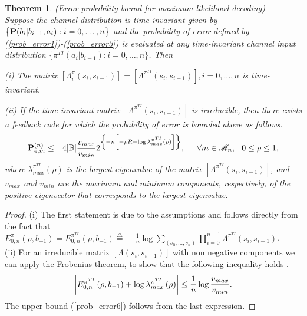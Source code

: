 \documentclass[11pt, a4paper, journal,onecolumn]{IEEEtran}
\newcommand{\mb}{\mathbb}
\newcommand{\sr}{\stackrel}
\newcommand{\tri}{\sr{\triangle}{=}}
\newcommand{\bea}{\begin{eqnarray}}
\newcommand{\eea}{\end{eqnarray}}
\newcommand{\hso}{\hspace{.1in}}
\newcommand{\hst}{\hspace{.2in}}
\newtheorem{theorem}{Theorem}[section]
\begin{document}
\begin{theorem}(Error probability bound for maximum likelihood decoding)\\
\label{the-exp}
Suppose the channel distribution is time-invariant given by  $\big\{{\bf P}(b_i|b_{i-1}, a_i): i=0, \ldots, n\big\}$ and the probability of error defined by (\ref{prob_error1})-(\ref{prob_error3}) is evaluated at any time-invariant channel input distribution $\big\{\pi^{TI}(a_i|b_{i-1}): i=0, \ldots, n\big\}$. Then 
\itemize
\item[(i)] The matrix $\left[ \Lambda_i^\pi(s_i,s_{i-1})\right]=\left[ \Lambda^{\pi^{TI}}(s_i,s_{i-1})\right], i=0, \ldots, n$ is time-invariant.
\item[(ii)]If the time-invariant matrix $\left[ \Lambda^{\pi^{TI}}(s_i,s_{i-1})\right]$ is irreducible, then  there exists a feedback code for which the probability of error is bounded above as follows.
\bea
{\bf P}_{e,m}^{(n)}&\leq& 4|{\mb B}|\frac{v_{max}}{v_{min}} 2^{\left\{-n\left[-\rho R -\log{\lambda_{max}^{\pi^{TI}}\left(\rho\right)}  \right] \right\}}, \hst  \forall m \in  {\cal M}_n, \hso  0\leq \rho \leq 1, \label{prob_error6}
\eea
where $\lambda_{max}^{\pi^{TI}}\left(\rho\right)$ is the largest eigenvalue of the matrix $\left[ \Lambda^{\pi^{TI}}(s_i,s_{i-1})\right]$, and $v_{max}$ and $v_{min}$ are
the maximum and  minimum components, respectively, of the positive eigenvector that corresponds to the largest eigenvalue. 
\end{theorem}
\begin{proof} (i) The first statement is due to the assumptions and follows directly from  the fact that $
E^{\pi}_{0,n}\left(\rho,b_{-1}\right)=E^{\pi^{TI}}_{0,n}\left(\rho, b_{-1}\right)\tri -\frac{1}{n}\log{\sum_{(s_0, \ldots, s_n)}\prod_{i=0}^{n-1}\Lambda^{\pi^{TI}}(s_i,s_{i-1})}$.\\  (ii) For an irreducible matrix $\left[ \Lambda(s_i,s_{i-1})\right]$ with non negative components  we can apply the Frobenius theorem, to show that the following inequality holds \cite{gallager}.
\bea
\bigg{|}E^{\pi^{TI}}_{0,n}\left(\rho,b_{-1}\right)+\log{\lambda_{max}^{\pi^{TI}}\left(\rho\right)} \bigg{|}\leq\frac{1}{n}\log{\frac{v_{max}}{v_{min}}}. \label{lem_gal}
\eea
The upper bound (\ref{prob_error6}) follows from the last expression. 
\end{proof} 
\end{document}
